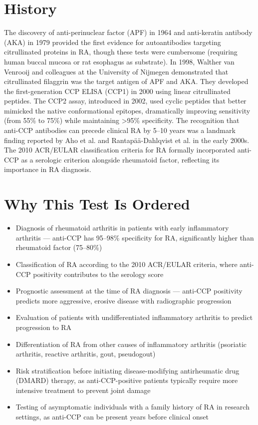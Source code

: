 \section*{History}
The discovery of anti-perinuclear factor (APF) in 1964 and anti-keratin antibody (AKA) in 1979 provided the first evidence for autoantibodies targeting citrullinated proteins in RA, though these tests were cumbersome (requiring human buccal mucosa or rat esophagus as substrate). In 1998, Walther van Venrooij and colleagues at the University of Nijmegen demonstrated that citrullinated filaggrin was the target antigen of APF and AKA. They developed the first-generation CCP ELISA (CCP1) in 2000 using linear citrullinated peptides. The CCP2 assay, introduced in 2002, used cyclic peptides that better mimicked the native conformational epitopes, dramatically improving sensitivity (from 55\% to 75\%) while maintaining >95\% specificity. The recognition that anti-CCP antibodies can precede clinical RA by 5--10 years was a landmark finding reported by Aho et al. and Rantap\"a\"a-Dahlqvist et al. in the early 2000s. The 2010 ACR/EULAR classification criteria for RA formally incorporated anti-CCP as a serologic criterion alongside rheumatoid factor, reflecting its importance in RA diagnosis.

\section*{Why This Test Is Ordered}
\begin{itemize}
  \item Diagnosis of rheumatoid arthritis in patients with early inflammatory arthritis --- anti-CCP has 95--98\% specificity for RA, significantly higher than rheumatoid factor (75--80\%)
  \item Classification of RA according to the 2010 ACR/EULAR criteria, where anti-CCP positivity contributes to the serology score
  \item Prognostic assessment at the time of RA diagnosis --- anti-CCP positivity predicts more aggressive, erosive disease with radiographic progression
  \item Evaluation of patients with undifferentiated inflammatory arthritis to predict progression to RA
  \item Differentiation of RA from other causes of inflammatory arthritis (psoriatic arthritis, reactive arthritis, gout, pseudogout)
  \item Risk stratification before initiating disease-modifying antirheumatic drug (DMARD) therapy, as anti-CCP-positive patients typically require more intensive treatment to prevent joint damage
  \item Testing of asymptomatic individuals with a family history of RA in research settings, as anti-CCP can be present years before clinical onset
\end{itemize}

